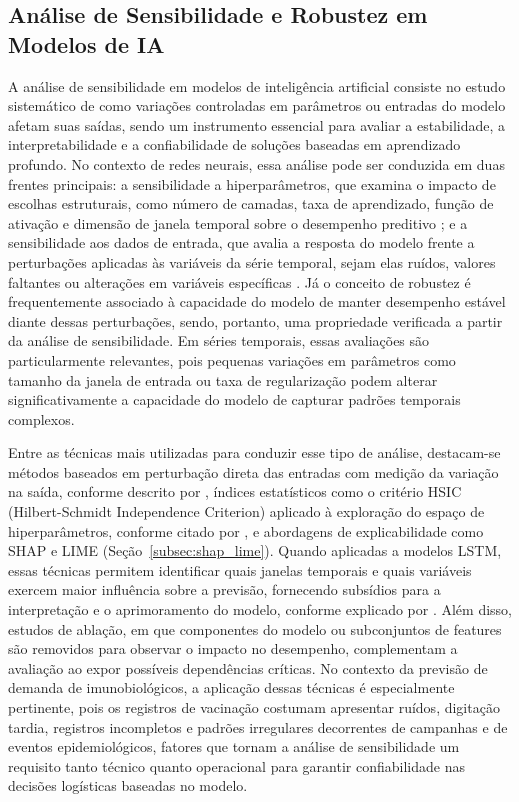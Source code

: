 \documentclass[
    12pt,
    openright,
    oneside,
    a4paper,
    english,
    brazil
]{abntex2}
\begin{document}
\subsection{Análise de Sensibilidade e Robustez em Modelos de IA}
\label{subsec:sensibilidade}

A análise de sensibilidade em modelos de inteligência artificial consiste no estudo sistemático de como variações controladas em parâmetros ou entradas do modelo afetam suas saídas, sendo um instrumento essencial para avaliar a estabilidade, a interpretabilidade e a confiabilidade de soluções baseadas em aprendizado profundo. No contexto de redes neurais, essa análise pode ser conduzida em duas frentes principais: a sensibilidade a hiperparâmetros, que examina o impacto de escolhas estruturais, como número de camadas, taxa de aprendizado, função de ativação e dimensão de janela temporal sobre o desempenho preditivo ; e a sensibilidade aos dados de entrada, que avalia a resposta do modelo frente a perturbações aplicadas às variáveis da série temporal, sejam elas ruídos, valores faltantes ou alterações em variáveis específicas . Já o conceito de robustez é frequentemente associado à capacidade do modelo de manter desempenho estável diante dessas perturbações, sendo, portanto, uma propriedade verificada a partir da análise de sensibilidade. Em séries temporais, essas avaliações são particularmente relevantes, pois pequenas variações em parâmetros como tamanho da janela de entrada ou taxa de regularização podem alterar significativamente a capacidade do modelo de capturar padrões temporais complexos.

Entre as técnicas mais utilizadas para conduzir esse tipo de análise, destacam-se métodos baseados em perturbação direta das entradas com medição da variação na saída, conforme descrito por , índices estatísticos como o critério HSIC (Hilbert-Schmidt Independence Criterion) aplicado à exploração do espaço de hiperparâmetros, conforme citado por , e abordagens de explicabilidade como SHAP e LIME (Seção~\ref{subsec:shap_lime}). Quando aplicadas a modelos LSTM, essas técnicas permitem identificar quais janelas temporais e quais variáveis exercem maior influência sobre a previsão, fornecendo subsídios para a interpretação e o aprimoramento do modelo, conforme explicado por . Além disso, estudos de ablação, em que componentes do modelo ou subconjuntos de features são removidos para observar o impacto no desempenho, complementam a avaliação ao expor possíveis dependências críticas. No contexto da previsão de demanda de imunobiológicos, a aplicação dessas técnicas é especialmente pertinente, pois os registros de vacinação costumam apresentar ruídos, digitação tardia, registros incompletos e padrões irregulares decorrentes de campanhas e de eventos epidemiológicos, fatores que tornam a análise de sensibilidade um requisito tanto técnico quanto operacional para garantir confiabilidade nas decisões logísticas baseadas no modelo.
\end{document}

